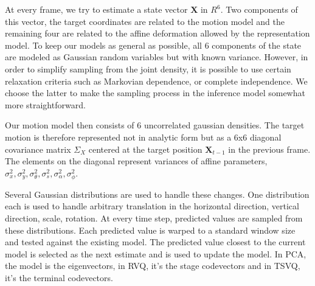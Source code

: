 
At every frame, we try to estimate a state vector $\mathbf{X}$ in $R^6$.  Two components of this vector, the target coordinates are related to the motion model and the remaining four are related to the affine deformation allowed by the representation model.  To keep our models as general as possible, all 6 components of the state are modeled as Gaussian random variables but with known variance.  However, in order to simplify sampling from the joint density, it is possible to use certain relaxation criteria such as Markovian dependence, or complete independence.  We choose the latter to make the sampling process in the inference model somewhat more straightforward.

Our motion model then consists of 6 uncorrelated gaussian densities. 
The target motion is therefore represented not in analytic form but as a 6x6 diagonal covariance matrix $\Sigma_X$ centered at the target position $\mathbf{X}_{t-1}$ in the previous frame.  The elements on the diagonal represent variances of affine parameters, $\sigma_x^2, \sigma_y^2, \sigma_\theta^2, \sigma_s^2, \sigma_\alpha^2, \sigma_\phi^2$.   


Several Gaussian distributions are used to handle these changes.  One distribution each is used to handle arbitrary translation in the horizontal direction, vertical direction, scale, rotation.  At every time step, predicted values are sampled from these distributions.  Each predicted value is warped to a standard window size and tested against the existing model.  The predicted value closest to the current model is selected as the next estimate and is used to update the model.  In PCA, the model is the eigenvectors, in RVQ, it's the stage codevectors and in TSVQ, it's the terminal codevectors.  

